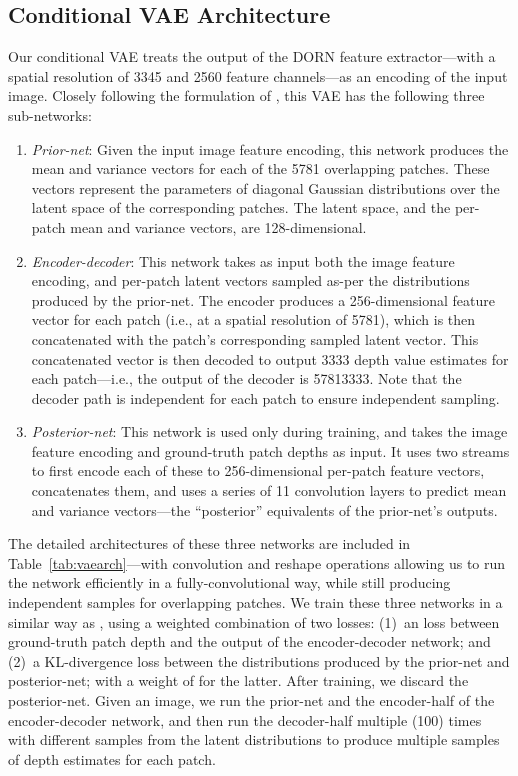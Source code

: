 \documentclass[10pt,twocolumn,letterpaper]{article}
\begin{document}
\subsection{Conditional VAE Architecture}

Our conditional VAE treats the output of the DORN feature extractor---with a spatial resolution of 3345 and 2560 feature channels---as an encoding of the input image. Closely following the formulation of \cite{condVAE}, this VAE has the following three sub-networks:
\begin{enumerate}
\item \emph{Prior-net}: Given the input image feature encoding, this network produces the mean and variance vectors for each of the 5781 overlapping patches. These vectors represent the parameters of diagonal Gaussian distributions over the latent space of the corresponding patches. The latent space, and the per-patch mean and variance vectors, are 128-dimensional.
\item \emph{Encoder-decoder}: This network takes as input both the image feature encoding, and per-patch latent vectors sampled as-per the distributions produced by the prior-net.  The encoder produces a 256-dimensional feature vector for each patch (i.e., at a spatial resolution of 5781), which is then concatenated with the patch's corresponding sampled latent vector. This concatenated vector is then decoded to output 3333 depth value estimates for each patch---i.e., the output of the decoder is 57813333. Note that the decoder path is independent for each patch to ensure independent sampling.
\item \emph{Posterior-net}: This network is used only during training, and takes the image feature encoding and ground-truth patch depths as input. It uses two streams to first encode each of these to 256-dimensional per-patch feature vectors, concatenates them, and uses a series of 11 convolution layers to predict mean and variance vectors---the ``posterior'' equivalents of the prior-net's outputs.
\end{enumerate}

The detailed architectures of these three networks are included in Table~\ref{tab:vaearch}---with convolution and reshape operations allowing us to run the network efficiently in a fully-convolutional way, while still producing independent samples for overlapping patches. We train these three networks in a similar way as \cite{condVAE}, using a weighted combination of two losses: (1)~an  loss between ground-truth patch depth and the output of the encoder-decoder network; and (2)~a KL-divergence loss between the distributions produced by the prior-net and posterior-net; with a weight of  for the latter. After training, we discard the posterior-net. Given an image, we run the prior-net and the encoder-half of the encoder-decoder network, and then run the decoder-half multiple (100) times with different samples from the latent distributions to produce multiple samples of depth estimates for each patch.
\end{document}

